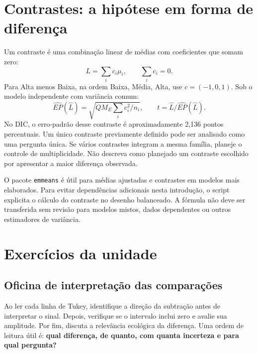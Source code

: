 \section{Contrastes: a hipótese em forma de diferença}
Um contraste é uma combinação linear de médias com coeficientes que somam zero:
\begin{equation}L=\sum_i c_i\mu_i,\qquad\sum_i c_i=0.\end{equation}
Para Alta menos Baixa, na ordem Baixa, Média, Alta, use $c=(-1,0,1)$. Sob o modelo independente com variância comum:
\begin{equation}\widehat{EP}(\widehat L)=\sqrt{QM_E\sum_i c_i^2/n_i},
\qquad t=\widehat L/\widehat{EP}(\widehat L).\end{equation}
No DIC, o erro-padrão desse contraste é aproximadamente 2,136 pontos percentuais. Um único contraste previamente definido pode ser analisado como uma pergunta única. Se vários contrastes integram a mesma família, planeje o controle de multiplicidade. Não descreva como planejado um contraste escolhido por apresentar a maior diferença observada.

O pacote \texttt{emmeans} é útil para médias ajustadas e contrastes em modelos mais elaborados. Para evitar dependências adicionais nesta introdução, o script explicita o cálculo do contraste no desenho balanceado. A fórmula não deve ser transferida sem revisão para modelos mistos, dados dependentes ou outros estimadores de variância.

\section{Exercícios da unidade}
\begin{enumerate}
\end{enumerate}
\subsection*{Oficina de interpretação das comparações}
Ao ler cada linha de Tukey, identifique a direção da subtração antes de interpretar o sinal. Depois, verifique se o intervalo inclui zero e avalie sua amplitude. Por fim, discuta a relevância ecológica da diferença. Uma ordem de leitura útil é: \textbf{qual diferença, de quanto, com quanta incerteza e para qual pergunta?}

